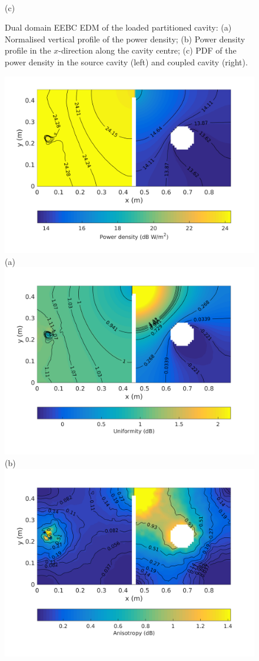 \documentclass[a4paper]{article}
\numberwithin{equation}{section}
\begin{document}
\begin{figure}[hp]
\begin{center}
\\
{\footnotesize (c)}\\
\vspace{-2mm}
\caption{\label{fg:partcylddm_profs} Dual domain EEBC EDM of the loaded partitioned cavity: (a) Normalised vertical profile of the power density; 
(b) Power density profile in the $x$-direction along the cavity centre; (c) PDF of the power density in the source cavity (left) and coupled cavity (right).}
\end{center}
\end{figure}

\begin{figure}[hp]
\begin{center}
\includegraphics[trim={0 8mm 0 12mm},clip,width=0.52\linewidth]{figures/DDM-EEBC_3D_DL_PowerDensityMap}\\
{\footnotesize (a)}\\
\vspace{2mm}
\includegraphics[trim={0 8mm 0 12mm},clip,width=0.52\linewidth]{figures/DDM-EEBC_3D_DL_EnergyDensityUniformityMap}\\
{\footnotesize (b)}\\
\vspace{2mm}
\includegraphics[trim={0 8mm 0 12mm},clip,width=0.52\linewidth]{figures/DDM-EEBC_3D_DL_EnergyDensityAnisotropyMap}\\

\end{center}
\end{figure}
\end{document}
